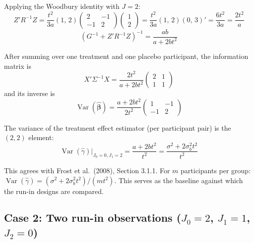 \documentclass[
  11pt,
]{article}
\begin{document}
Applying the Woodbury identity with \(J = 2\):
\begin{equation}
  Z'R^{-1}Z = \frac{t^2}{3a}(1,\,2)
    \begin{pmatrix}2&-1\\-1&2\end{pmatrix}
    \begin{pmatrix}1\\2\end{pmatrix}
  = \frac{t^2}{3a}(1,\,2)(0,\,3)' = \frac{6t^2}{3a}
  = \frac{2t^2}{a}
\end{equation}
\begin{equation}
  (G^{-1} + Z'R^{-1}Z)^{-1}
  = \frac{ab}{a + 2bt^2}
\end{equation}

After summing over one treatment and one placebo participant,
the information matrix is
\begin{equation}
  X'\Sigma^{-1}X
  = \frac{2t^2}{a + 2bt^2}
    \begin{pmatrix} 2 & 1 \\ 1 & 1 \end{pmatrix}
\end{equation}
and its inverse is
\begin{equation}
  \mathop{\mathrm{Var}}(\hat{\boldsymbol{\beta}})
  = \frac{a + 2bt^2}{2t^2}
    \begin{pmatrix} 1 & -1 \\ -1 & 2 \end{pmatrix}
  \label{eq:var_frost}
\end{equation}

The variance of the treatment effect estimator (per
participant pair) is the \((2,2)\) element:
\begin{equation}
  \boxed{
    \mathop{\mathrm{Var}}(\hat{\gamma})\big|_{J_0=0,J_1=2}
    = \frac{a + 2bt^2}{t^2}
    = \frac{\sigma^2 + 2\sigma_b^2 t^2}{t^2}
  }
  \label{eq:var_r0k2}
\end{equation}

This agrees with Frost et al.~(2008), Section 3.1.1. For
\(m\) participants per group:
\(\mathop{\mathrm{Var}}(\hat{\gamma}) = (\sigma^2 + 2\sigma_b^2 t^2) /
(m t^2)\). This serves as the baseline against which the
run-in designs are compared.

\subsection{\texorpdfstring{Case 2: Two run-in observations (\(J_0=2\), \(J_1=1\), \(J_2=0\))}{Case 2: Two run-in observations (J\_0=2, J\_1=1, J\_2=0)}}\label{case-2-two-run-in-observations-j_02-j_11-j_20}
\end{document}
